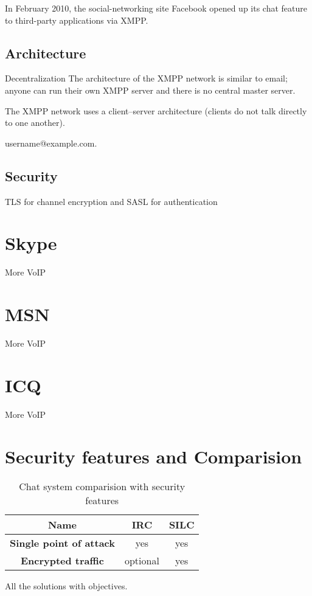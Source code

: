 In February 2010, the social-networking site Facebook opened up its chat feature to third-party applications via XMPP.

\subsection{Architecture}

Decentralization
The architecture of the XMPP network is similar to email; anyone can run their own XMPP server and there is no central master server.

The XMPP network uses a client–server architecture (clients do not talk directly to one another). 

username@example.com.
\subsection{Security}
TLS for channel encryption and SASL for authentication

\section{Skype}
More VoIP
\section{MSN}
More VoIP
\section{ICQ}
More VoIP


\section{Security features and Comparision}

\begin{longtable}{|c|c|c|}
\caption{Chat system comparision with security features}\\
\hline
\textbf{Name} & \textbf{IRC} & \textbf{SILC}\\
\hline
\textbf{Single point of attack} & yes & yes\\
\hline
\textbf{Encrypted traffic} & optional & yes\\
\hline
\end{longtable}

All the solutions with objectives.
